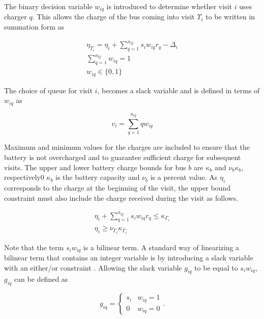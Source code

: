 \documentclass[11pt,a4paper,final]{article}
\begin{document}
The binary decision variable \(w_{iq}\) is introduced to determine whether visit \(i\) uses charger \(q\). This allows the
charge of the bus coming into visit \(\Upsilon_i\) to be written in summation form as

\begin{subequations}
    \label{subeq:pre_next_charge}
\begin{align}
    \eta_{\Upsilon_i} = \eta_i + \sum_{q=1}^{n_Q} s_i w_{iq} r_q - \Delta_i  \\
    \sum_{q=1}^{n_Q} w_{iq} = 1 \\
    w_{iq} \in \{0,1\}
\end{align}
\end{subequations}

The choice of queue for visit \(i\), becomes a slack variable and is defined in terms of \(w_{iq}\) as

\begin{equation}
    v_i = \sum_{q=1}^{n_Q} qw_{iq}
\end{equation}

Maximum and minimum values for the charges are included to ensure that the battery is not overcharged and to guarantee
sufficient charge for subsequent visits. The upper and lower battery charge bounds for bus \(b\) are \(\kappa_b\) and \(\nu_b \kappa_b\),
respectively0 \(\kappa_b\) is the battery capacity and \(\nu_b\) is a percent value. As \(\eta_i\) corresponds to the charge at the
beginning of the visit, the upper bound constraint must also include the charge received during the visit as follows.

\begin{subequations}
    \label{subeq:pre_min_max}
\begin{align}
    \eta_i + \sum_{q=1}^{n_Q} s_i w_{iq} r_q \leq \kappa_{\Gamma_i}                 \\
    \eta_i \geq \nu_{\Gamma_i} \kappa_{\Gamma_i}
\end{align}
\end{subequations}

Note that the term \(s_i w_{iq}\) is a bilinear term. A standard way of linearizing a bilinear term that contains an
integer variable is by introducing a slack variable with an either/or constraint
\cite[,rodriguez-2013-compar-asses]{chen-2010-applied}. Allowing the slack variable \(g_{iq}\) to be equal to \(s_i w_{iq}\),
\(g_{iq}\) can be defined as

\begin{equation}
    \label{eq:giq_cases}
    g_{iq} =
    \begin{cases}
        s_i & w_{iq} = 1 \\
        0 & w_{iq} = 0
    \end{cases}.
\end{equation}
\end{document}
